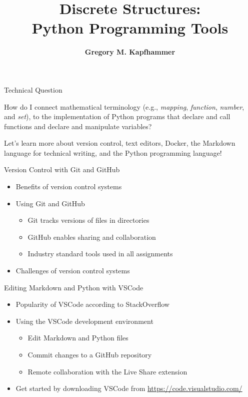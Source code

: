\documentclass[14pt,aspectratio=169]{beamer}
\title{Discrete Structures: \\ Python Programming Tools}
\author{{\bf Gregory M. Kapfhammer}}
\institute[shortinst]{{\bf Department of Computer Science, Allegheny College}}
\begin{document}
{
  \begin{frame}
    \titlepage
  \end{frame}
}

%
\begin{frame}{Technical Question}
  \begin{center}
    {\large How do I connect mathematical terminology (e.g., {\em mapping},
      {\em function}, {\em number}, and {\em set}), to the implementation of
      Python programs that declare and call functions and declare and manipulate
    variables?}
  \end{center}
  \vspace{2ex}
  \begin{center}
    \small Let's learn more about version control, text editors, Docker, the
    Markdown language for technical writing, and the Python programming
    language!
  \end{center}
\end{frame}

%
\begin{frame}{Version Control with Git and GitHub}
%
  \begin{itemize}
    \item Benefits of version control systems
    \item Using Git and GitHub
      \begin{itemize}
        \item Git tracks versions of files in directories
        \item GitHub enables sharing and collaboration
        \item Industry standard tools used in all assignments
      \end{itemize}
    \item Challenges of version control systems
  \end{itemize}
%
\end{frame}

%
\begin{frame}{Editing Markdown and Python with VSCode}
%
  \begin{itemize}
    \item Popularity of VSCode according to StackOverflow
    \item Using the VSCode development environment
      \begin{itemize}
        \item Edit Markdown and Python files
        \item Commit changes to a GitHub repository
        \item Remote collaboration with the Live Share extension
      \end{itemize}
    \item Get started by downloading VSCode from \url{https://code.visualstudio.com/}
  \end{itemize}
%
\end{frame}
\end{document}
